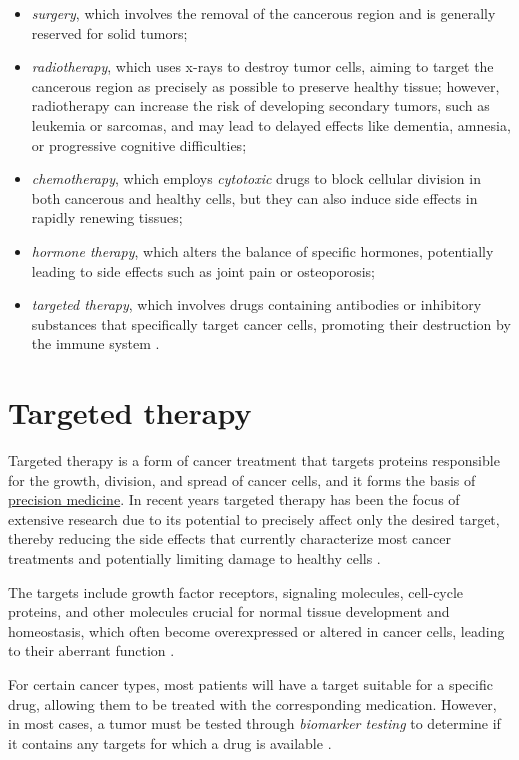 \begin{itemize}
    \item \textit{surgery}, which involves the removal of the cancerous region and is generally reserved for solid tumors;
    \item \textit{radiotherapy}, which uses x-rays to destroy tumor cells, aiming to target the cancerous region as precisely as possible to preserve healthy tissue; however, radiotherapy can increase the risk of developing secondary tumors, such as leukemia or sarcomas, and may lead to delayed effects like dementia, amnesia, or progressive cognitive difficulties;
    \item \textit{chemotherapy}, which employs \textit{cytotoxic} drugs to block cellular division in both cancerous and healthy cells, but they can also induce side effects in rapidly renewing tissues;
    \item \textit{hormone therapy}, which alters the balance of specific hormones, potentially leading to side effects such as joint pain or osteoporosis;
    \item \textit{targeted therapy}, which involves drugs containing antibodies or inhibitory substances that specifically target cancer cells, promoting their destruction by the immune system \cite{target_therapy1}.
\end{itemize}

\section{Targeted therapy}

Targeted therapy is a form of cancer treatment that targets proteins responsible for the growth, division, and spread of cancer cells, and it forms the basis of \href{https://en.wikipedia.org/wiki/Personalized_medicine}{precision medicine}. In recent years targeted therapy has been the focus of extensive research due to its potential to precisely affect only the desired target, thereby reducing the side effects that currently characterize most cancer treatments and potentially limiting damage to healthy cells \cite{target_therapy1}.

The targets include growth factor receptors, signaling molecules, cell-cycle proteins, and other molecules crucial for normal tissue development and homeostasis, which often become overexpressed or altered in cancer cells, leading to their aberrant function \cite{se_tt}.

For certain cancer types, most patients will have a target suitable for a specific drug, allowing them to be treated with the corresponding medication. However, in most cases, a tumor must be tested through \textit{biomarker testing} to determine if it contains any targets for which a drug is available \cite{target_therapy1}.


